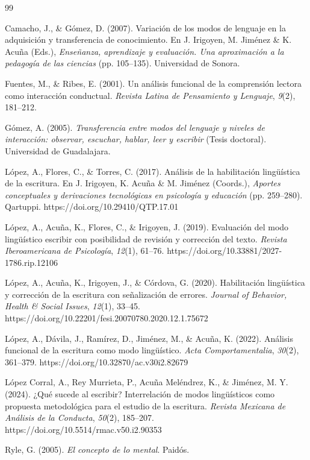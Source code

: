 \documentclass[12pt]{article}
\begin{document}
	\begin{thebibliography}{99}
		
		Camacho, J., \& Gómez, D. (2007). Variación de los modos de lenguaje en la adquisición y transferencia de conocimiento. En J. Irigoyen, M. Jiménez \& K. Acuña (Eds.), \emph{Enseñanza, aprendizaje y evaluación. Una aproximación a la pedagogía de las ciencias} (pp. 105--135). Universidad de Sonora.
		
		Fuentes, M., \& Ribes, E. (2001). Un análisis funcional de la comprensión lectora como interacción conductual. \emph{Revista Latina de Pensamiento y Lenguaje}, \emph{9}(2), 181--212.
		
		Gómez, A. (2005). \emph{Transferencia entre modos del lenguaje y niveles de interacción: observar, escuchar, hablar, leer y escribir} (Tesis doctoral). Universidad de Guadalajara.
		
		López, A., Flores, C., \& Torres, C. (2017). Análisis de la habilitación lingüística de la escritura. En J. Irigoyen, K. Acuña \& M. Jiménez (Coords.), \emph{Aportes conceptuales y derivaciones tecnológicas en psicología y educación} (pp. 259--280). Qartuppi.
		https://doi.org/10.29410/QTP.17.01
		
		López, A., Acuña, K., Flores, C., \& Irigoyen, J. (2019). Evaluación del modo lingüístico escribir con posibilidad de revisión y corrección del texto. \emph{Revista Iberoamericana de Psicología}, \emph{12}(1), 61--76. https://doi.org/10.33881/2027-1786.rip.12106
		
		López, A., Acuña, K., Irigoyen, J., \& Córdova, G. (2020). Habilitación lingüística y corrección de la escritura con señalización de errores. \emph{Journal of Behavior, Health \& 	Social Issues}, \emph{12}(1), 33--45. 
		https://doi.org/10.22201/fesi.20070780.2020.12.1.75672
		
		López, A., Dávila, J., Ramírez, D., Jiménez, M., \& Acuña, K. (2022). Análisis funcional de la escritura como modo lingüístico. \emph{Acta Comportamentalia}, \emph{30}(2), 361--379.
		https://doi.org/10.32870/ac.v30i2.82679
		
		López Corral, A., Rey Murrieta, P., Acuña Meléndrez, K., \& Jiménez, M. Y. (2024). ¿Qué sucede al escribir? Interrelación de modos lingüísticos como propuesta metodológica para el
		estudio de la escritura. \emph{Revista Mexicana de Análisis de la Conducta}, \emph{50}(2), 185--207. https://doi.org/10.5514/rmac.v50.i2.90353
		
		Ryle, G. (2005). \emph{El concepto de lo mental}. Paidós.
		
	\end{thebibliography}
	
\end{document}
